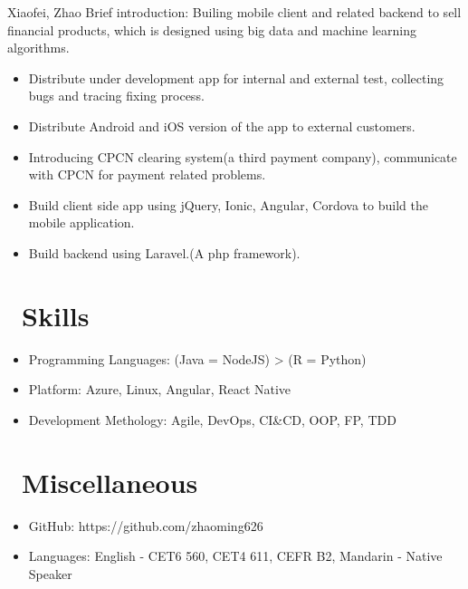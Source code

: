 \documentclass{resume}
\begin{document}
 {Xiaofei, Zhao}
Brief introduction: Builing mobile client and related backend to sell financial products, which is designed using big data and machine learning algorithms.
\begin{itemize}
  \item Distribute under development app for internal and external test, collecting bugs and tracing fixing process.
  \item Distribute Android and iOS version of the app to external customers.
  \item Introducing CPCN clearing system(a third payment company), communicate with CPCN for payment related problems.
  \item Build client side app using jQuery, Ionic, Angular, Cordova to build the mobile application. 
  \item Build backend using Laravel.(A php framework).
\end{itemize}



\section{\faCogs\ Skills}
\begin{itemize}[parsep=0.5ex]
  \item Programming Languages: (Java = NodeJS) > (R = Python) 
  \item Platform: Azure, Linux, Angular, React Native
  \item Development Methology: Agile, DevOps, CI\&CD, OOP, FP, TDD
\end{itemize}

\section{\faInfo\ Miscellaneous}
\begin{itemize}[parsep=0.5ex]
  \item GitHub: https://github.com/zhaoming626
  \item Languages: English - CET6 560, CET4 611, CEFR B2, Mandarin - Native Speaker
\end{itemize}

%
%
\end{document}
